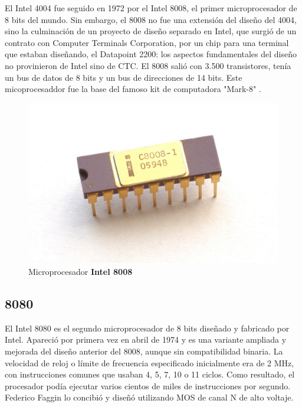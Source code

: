 El Intel 4004 fue seguido en 1972 por el Intel 8008, el primer microprocesador de 8 bits del mundo. Sin embargo, el 8008 no fue una extensión del diseño del 4004, 
sino la culminación de un proyecto de diseño separado en Intel, que surgió de un contrato con Computer Terminals Corporation, por un chip para una 
terminal que estaban diseñando, el Datapoint 2200: los aspectos fundamentales del diseño no provinieron de Intel sino de CTC. 
El 8008 salió con 3.500 transistores, tenía un bus de datos de 8 bits y un bus de direcciones de 14 bits. Este micoprocesaddor fue la base del famoso kit de 
computadora "Mark-8" .
\begin{figure}[htb]
	\centering
	\includegraphics[scale = 0.15]{Graphics/Intel_C8008-1.jpg}
	\caption{Microprocesador  \textbf{Intel 8008}}
	\label{fig:13}
\end{figure}

\subsection{8080}
El Intel 8080 es el segundo microprocesador de 8 bits diseñado y fabricado por Intel. Apareció por primera vez en abril de 1974 y es una variante ampliada y mejorada
del diseño anterior del 8008, aunque sin compatibilidad binaria. La velocidad de reloj o límite de frecuencia especificado inicialmente era de 2 MHz, con instrucciones
comunes que usaban 4, 5, 7, 10 o 11 ciclos. Como resultado, el procesador podía ejecutar varios cientos de miles de instrucciones por segundo. Federico Faggin lo concibió 
y diseñó utilizando MOS de canal N de alto voltaje.


